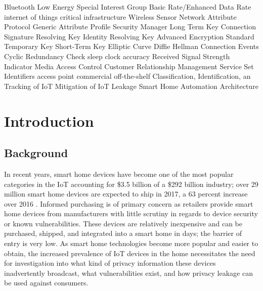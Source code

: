 \documentclass[12pt,letterpaper,oneside]{book}
\begin{document}
	\begin{acronym}
		 {Bluetooth Low Energy}
		 {Special Interest Group}
		 {Basic Rate/Enhanced Data Rate}
		 {internet of things}
		 {critical infrastructure}
		 {Wireless Sensor Network}
		 {Attribute Protocol}
		 {Generic Attribute Profile}
		 {Security Manager}
		 {Long Term Key}
		 {Connection Signature Resolving Key}
		 {Identity Resolving Key}
		 {Advanced Encryption Standard}
		 {Temporary Key}
		 {Short-Term Key}
		 {Elliptic Curve Diffie Hellman}
		 {Connection Events}
		 {Cyclic Redundancy Check}
		 {sleep clock accuracy}
		 {Received Signal Strength Indicator}
		 {Media Access Control}
		 {Customer Relationship Management}
		 {Service Set Identifiers}
		 {access point}
		 {commercial off-the-shelf}
		 {Classification, Identification, an Tracking of \ac{IoT}}
		 {Mitigation of \ac{IoT} Leakage}
		 {Smart Home Automation Architecture}
	\end{acronym}
\mainmatter
	\chapter{Introduction}
	
		\section{Background}
		In recent years, smart home devices have become one of the most popular categories in the \ac{IoT} accounting for \$3.5 billion of a \$292 billion industry; over 29 million smart home devices are expected to ship in 2017, a 63 percent increase over 2016 \cite{consumerTech}. Informed purchasing is of primary concern as retailers provide smart home devices from manufacturers with little scrutiny in regards to device security or known vulnerabilities. These devices are relatively inexpensive and can be purchased, shipped, and integrated into a smart home in days; the barrier of entry is very low. As smart home technologies become more popular and easier to obtain, the increased prevalence of \ac{IoT} devices in the home necessitates the need for investigation into what kind of privacy information these devices inadvertently broadcast, what vulnerabilities exist, and how privacy leakage can be used against consumers.
		
\end{document}
